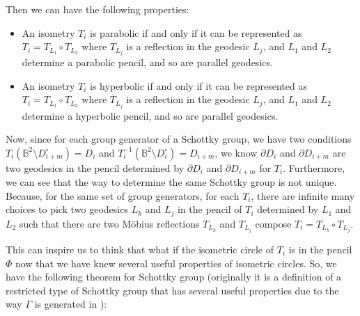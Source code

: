 \documentclass[12pt,oneside]{sfsuthesis}
\theoremstyle{plain} %
\theoremstyle{definition}  %
\theoremstyle{remark}  %
\theoremstyle{plain}
\begin{document}
{Then we can have the following properties\cite[section 7.32, 7.34]{beardon2012geometry}:
\begin{itemize}
\item An isometry $T_i$ is parabolic if and only if it can be represented as $T_i=T_{L_{1}}\circ T_{L_{2}}$ where $T_{L_{j}}$ is a reflection in the geodesic $L_j$, and $L_1$ and $L_2$ determine a parabolic pencil, and so are parallel geodesics.
\item An isometry $T_i$ is hyperbolic if and only if it can be represented as $T_i=T_{L_{1}}\circ T_{L_{2}}$ where $T_{L_{j}}$ is a reflection in the geodesic $L_j$, and $L_1$ and $L_2$ determine a hyperbolic pencil, and so are parallel geodesics.
\end{itemize}

Now, since for each group generator of a Schottky group, we have two conditions $T_i (\mathbb{B}^2\setminus D^{\circ}_{i+m}) = D_{i}$ and $T_i^{-1}\left( \mathbb{B}^2\setminus D^{\circ}_{i}\right)=D_{i+m}$, we know $\partial D_i$ and $\partial D_{i+m}$ are two geodesics in the pencil determined by $\partial D_i$ and $\partial D_{i+m}$ for $T_i$. Furthermore, we can see that the way to determine the same Schottky group is not unique. Because, for the same set of group generators, for each $T_i$, there are infinite many choices to pick two geodesics $L_k$ and $L_j$ in the pencil of $T_i$ determined by $L_1$ and $L_2$ such that there are two M\"{o}bius reflections $T_{L_{k}}$ and $T_{L_{j}}$ compose $T_i=T_{L_{k}}\circ T_{L_{j}}$.

This can inspire us to think that what if the isometric circle of $T_i$ is in the pencil $\Phi$ now that we have knew several useful properties of isometric circles. So, we have the following theorem for Schottky group (originally it is a definition of a restricted type of Schottky group that has several useful properties due to the way $\Gamma$ is generated in \cite{dal2010geodesic}):

}
\end{document}
